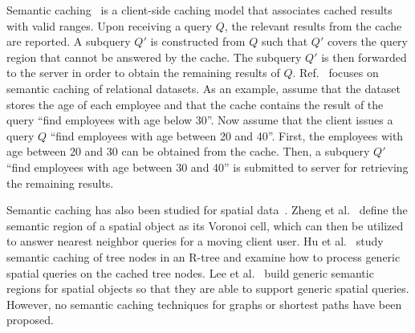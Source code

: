 \documentclass{sig-alternate}
\newcommand{\stitle}[1]{\vspace*{0.4em}\noindent{\bf #1:\/}}
\begin{document}
Semantic caching~\cite{DarFJST96} is a client-side caching model that associates cached results with valid ranges.
Upon receiving a query $Q$, the relevant results from the cache are reported.
A subquery $Q'$ is constructed from $Q$ such that $Q'$ covers the query region that cannot be answered by the cache.
The subquery $Q'$ is then forwarded to the server in order to obtain the remaining results of $Q$.
Ref.~\cite{DarFJST96} focuses on semantic caching of relational datasets.
As an example, assume that the dataset stores the age of each employee
and that the cache contains the result of the query ``find employees with age below 30''.
Now assume that the client issues a query $Q$ ``find employees with age between 20 and 40''.
First, the employees with age between 20 and 30 can be obtained from the cache.
Then, a subquery $Q'$ ``find employees with age between 30 and 40'' is submitted to server for retrieving
the remaining results.


Semantic caching has also been studied for spatial data~\cite{ZhengL01,pcsqm,ccslbs}.
Zheng et al.~\cite{ZhengL01} define the semantic region of a spatial object as its Voronoi cell,
which can then be utilized to answer nearest neighbor queries for a moving client user.
Hu et al.~\cite{pcsqm} study semantic caching of tree nodes in an R-tree and
examine how to process generic spatial queries on the cached tree nodes.
Lee et al.~\cite{ccslbs} build generic semantic regions for spatial objects so that
they are able to support generic spatial queries.
However, no semantic caching techniques for graphs or shortest paths have been proposed.











%
%
\end{document}
